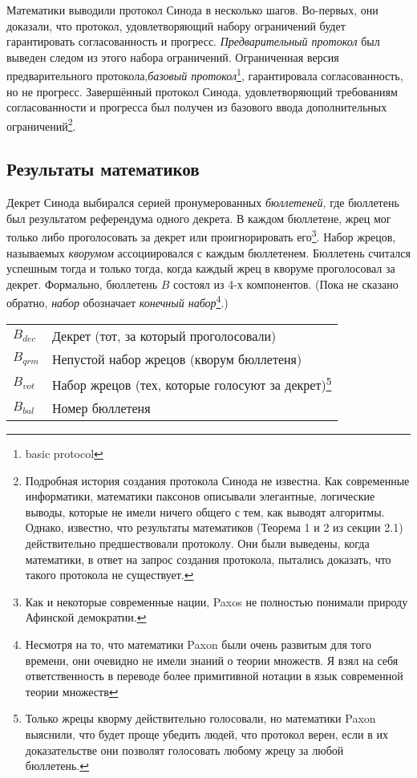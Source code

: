 \documentclass[12pt, a4paper]{article} %
\begin{document}
Математики выводили протокол Синода в несколько шагов. Во-первых, они доказали, что протокол, удовлетворяющий набору ограничений будет гарантировать согласованность  и прогресс. \textit{Предварительный протокол} был выведен следом из этого набора ограничений. Ограниченная  версия предварительного протокола,\textit{базовый протокол}\footnote{basic protocol}, гарантировала согласованность, но не прогресс. Завершённый протокол Синода, удовлетворяющий требованиям согласованности и прогресса был получен из базового ввода дополнительных ограничений\footnote{Подробная история создания протокола Синода не известна. Как современные информатики, математики паксонов описывали элегантные, логические выводы, которые не имели ничего общего с тем, как выводят алгоритмы. Однако, известно, что результаты математиков (Теорема 1 и 2 из секции 2.1) действительно предшествовали протоколу. Они были выведены, когда математики, в ответ на запрос создания протокола, пытались доказать, что такого протокола не существует.
}.

\subsection{Результаты математиков}

Декрет Синода выбирался серией пронумерованных \textit{бюллетеней}, где бюллетень был результатом референдума одного декрета. В каждом бюллетене, жрец мог только либо проголосовать за декрет или проигнорировать его\footnote{Как и некоторые современные нации, Paxos не полностью понимали природу Афинской демократии.}. Набор жрецов, называемых \textit{кворумом} ассоциировался с каждым бюллетенем. Бюллетень считался успешным тогда и только тогда, когда каждый жрец в кворуме проголосовал за декрет.  Формально, бюллетень $B$ состоял из 4-х компонентов. (Пока не сказано обратно, \textit{набор} обозначает \textit{конечный набор}\footnote{Несмотря на то, что математики Paxon были очень развитым для того времени, они очевидно не имели знаний о теории множеств. Я взял на себя ответственность в переводе более примитивной нотации в язык современной теории множеств}.)
\begin{table}[h]
\begin{tabular}{ l p{10.5cm}}
    $B_{dec}$ & Декрет (тот, за который проголосовали)\\
    $B_{qrm}$ & Непустой набор жрецов (кворум бюллетеня)\\
    $B_{vot}$ & Набор жрецов (тех, которые голосуют за декрет)\footnote{Только жрецы кворму действительно голосовали, но математики Paxon выяснили, что будет проще убедить людей, что протокол верен, если в их доказательстве они позволят голосовать любому жрецу за любой бюллетень.}\\
    $B_{bal}$ & Номер бюллетеня
\end{tabular}
\end{table}
\end{document}
